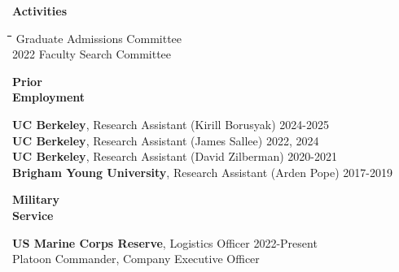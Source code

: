 \documentclass[10pt, oneside]{article}
\newcommand\mytabs{\hspace*{1cm}\=\hspace{1cm}\=\hspace{1cm}\=\hspace{1cm}\=\hspace{1cm}\=\hspace{1cm}\=\hspace{1cm}\=\hspace{1cm}\=\hspace{1cm}\=\hspace{1cm}}
\newenvironment{mysec}[1][\mytabs]
  {\begin{tabbing}#1\kill\ignorespaces}
  {\end{tabbing}}
\begin{document}

\begin{minipage}[t]{0.1\linewidth}
\textbf{Activities}
\end{minipage}\hspace{0.05\linewidth}
\begin{minipage}[t]{0.8\linewidth}
\begin{mysec}
    2024 \>\> Graduate Admissions Committee \\
    2022 \>\> Faculty Search Committee \\
\end{mysec}
\end{minipage}\vspace{5mm}


\begin{minipage}[t]{0.1\linewidth}
\textbf{Prior \\ Employment}
\end{minipage}\hspace{0.05\linewidth}
\begin{minipage}[t]{0.8\linewidth}
\textbf{UC Berkeley}, Research Assistant (Kirill Borusyak) \hfill 2024-2025 \\
\textbf{UC Berkeley}, Research Assistant (James Sallee) \hfill 2022, 2024 \\
\textbf{UC Berkeley}, Research Assistant (David Zilberman) \hfill 2020-2021 \\
\textbf{Brigham Young University}, Research Assistant (Arden Pope) \hfill 2017-2019 \\
\end{minipage}\vspace{5mm}

\begin{minipage}[t]{0.1\linewidth}
\textbf{Military \\ Service}
\end{minipage}\hspace{0.05\linewidth}
\begin{minipage}[t]{0.8\linewidth}
\textbf{US Marine Corps Reserve}, Logistics Officer \hfill 2022-Present \\
Platoon Commander, Company Executive Officer
\end{minipage}\vspace{5mm}
\end{document}
